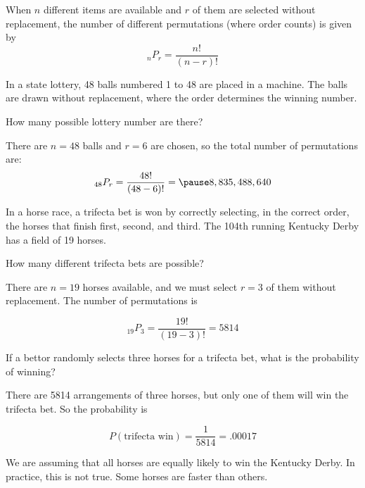 \documentclass{beamer}
\newcommand{\prob}[1]{P\left(#1\right)}
\newcommand{\perm}[2]{_{#1}P_{#2}}
\begin{document}
\begin{frame}
\begin{definition}
When $n$ different items are available and $r$ of them are selected without replacement, the number of different permutations (where order counts) is given by
\begin{equation*}
\perm{n}{r}=\dfrac{n!}{(n-r)!}
\end{equation*}
\end{definition}\pause

\begin{example}
In a state lottery, 48 balls numbered 1 to 48 are placed in a machine. The balls are drawn without replacement, where the order determines the winning number. 

\vspace{1mm}
How many possible lottery number are there?\pause

\vspace{1mm}
There are $n=48$ balls and $r=6$ are chosen, so the total number of permutations are:
\begin{equation*}
\perm{48}{r} =\dfrac{48!}{(48-6)!}=\pause 8,835,488,640
\end{equation*}
\end{example}
\end{frame}

\begin{frame}
\begin{example}
In a horse race, a trifecta bet is won by correctly selecting, in the correct order, the horses that finish first, second, and third. The 104th running Kentucky Derby has a field of 19 horses.

\vspace{1mm}
How many different trifecta bets are possible?\pause

\vspace{1mm}
There are $n=19$ horses available, and we must select $r=3$ of them without replacement. The number of permutations is

\vspace{-2mm}
\begin{equation*}
\perm{19}{3}=\dfrac{19!}{(19-3)!}=5814
\end{equation*}\pause

\vspace{-4mm}
If a bettor randomly selects three horses for a trifecta bet, what is the probability of winning?\pause

\vspace{1mm}
There are 5814 arrangements of three horses, but only one of them will win the trifecta bet. So the probability is

\vspace{-3mm}
\begin{equation*}
\prob{\text{trifecta win}}=\dfrac{1}{5814}=.00017
\end{equation*}\pause

\vspace{-4mm}
We are assuming that all horses are equally likely to win the Kentucky Derby. In practice, this is not true. Some horses are faster than others.
\end{example}
\end{frame}
\end{document}

